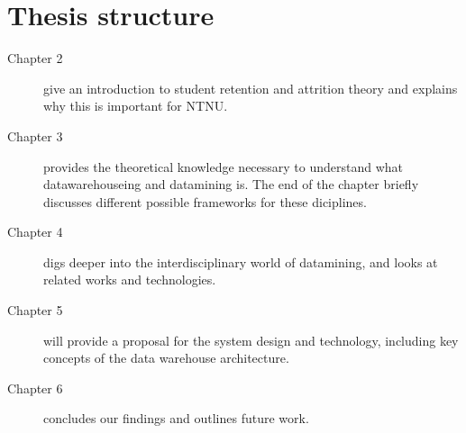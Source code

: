 \section{Thesis structure}
	
		\begin{description}
			\item[Chapter 2] give an introduction to student retention and attrition theory and explains why this is important for NTNU.
			\item[Chapter 3] provides the theoretical knowledge necessary to understand what datawarehouseing and datamining is. 
				The end of the chapter briefly discusses different possible frameworks for these diciplines.
			\item[Chapter 4] digs deeper into the interdisciplinary world of datamining, and looks at related works and technologies.
			\item[Chapter 5] will provide a proposal for the system design and technology, 
				including key concepts of the data warehouse architecture.
			\item[Chapter 6] concludes our findings and outlines future work.
				
		\end{description}